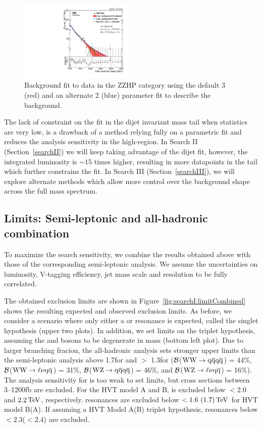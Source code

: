 \begin{figure}[h!]
\centering
\includegraphics[width=0.49\textwidth]{figures/analysis/search1/misc/CMS-PAS-EXO-15-002_Figure_004-e.pdf}
\caption{Background fit to data in the ZZHP category using the default 3 (red) and an alternate 2 (blue) parameter fit to describe the background.}
\label{fig:app:ZZHP2vs3p}
\end{figure}


The lack of constraint on the fit in the dijet invariant mass tail when statistics are very low, is a drawback of a method relying fully on a parametric fit and reduces the analysis sensitivity in the high-\mjj region. In Search II (Section~\ref{searchII}) we will keep taking advantage of the dijet fit, however, the integrated luminosity is $\sim 15$ times higher, resulting in more datapoints in the \mjj tail which further constrains the fit. In Search III (Section~\ref{searchIII}), we will explore alternate methods which allow more control over the background shape across the full mass spectrum. 

\subsection{Limits: Semi-leptonic and all-hadronic combination}
\label{sec:searchI:resultsComb}

To maximize the search sensitivity, we combine the results obtained above with those of the corresponding semi-leptonic analysis. We assume the uncertainties on luminosity, V-tagging efficiency, jet mass scale and resolution to be fully correlated.

The obtained exclusion limits are shown in Figure~\ref{fig:searchI:limitCombined} shows the resulting expected and observed
exclusion limits. As before, we consider a scenario where only either a \PWpr or \PZpr resonance is expected, called the singlet hypothesis (upper two plots). In addition, we set limits on the triplet hypothesis, assuming the \PWpr and \PZpr bosons to be degenerate in mass (bottom left plot).
Due to larger branching fracion, the all-hadronic analysis sets stronger upper limits than the semi-leptonic analysis above 1.7\TeV for \PZpr and $>$ 1.3\TeV for \PWpr ($\cal B$($\mathrm{W}\mathrm{W}\to\mathrm{q}\overline{\mathrm{q}}\mathrm{q}\overline{\mathrm{q}}$) = 44\%, $\cal B$($\mathrm{W}\mathrm{W}\to\ell\nu\mathrm{q}\overline{\mathrm{q}}$) = 31\%, $\cal B$($\mathrm{W}\mathrm{Z}\to\mathrm{q}\overline{\mathrm{q}}\mathrm{q}\overline{\mathrm{q}}$) = 46\%, and $\cal B$($\mathrm{W}\mathrm{Z}\to\ell\nu\mathrm{q}\overline{\mathrm{q}}$) = 16\%). 
The analysis sensitivity for \BulkG is too weak to set limits, but cross sections between 3--1200\unit{fb} are excluded.
For the HVT model A and B, \PWpr is excluded below $< 2.0$ and $2.2 \,\text{Te\hspace{-.08em}V}$, respectively. \PZpr resonances are excluded below $< 1.6~(1.7)\,\text{Te\hspace{-.08em}V}$ for HVT model B(A). If assuming a HVT Model A(B) triplet hypothesis, resonances below $< 2.3$($< 2.4$) \TeV are excluded.


